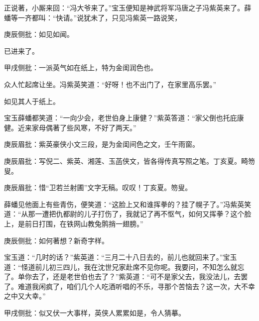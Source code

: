 \begin{parag}
    正说著，小厮来回：“冯大爷来了。”宝玉便知是神武将军冯唐之子冯紫英来了。薛蟠等一齐都叫：“快请。”说犹未了，只见冯紫英一路说笑，\begin{note}庚辰侧批：如见如闻。\end{note}已进来了。\begin{note}甲戌侧批：一派英气如在纸上，特为金闺润色也。\end{note}众人忙起席让坐。冯紫英笑道：“好呀！也不出门了，在家里高乐罢。”\begin{note}如见其人于纸上。\end{note}宝玉薛蟠都笑道：“一向少会，老世伯身上康健？”紫英答道：“家父倒也托庇康健。近来家母偶著了些风寒，不好了两天。”\begin{note}庚辰眉批：紫英豪侠小文三段，是为金闺间色之文，壬午雨窗。\end{note}\begin{note}庚辰眉批：写倪二、紫英、湘莲、玉菡侠文，皆各得传真写照之笔。丁亥夏。畸笏叟。\end{note}\begin{note}庚辰眉批：惜“卫若兰射圃”文字无稿。叹叹！丁亥夏。笏叟。\end{note}薛蟠见他面上有些青伤，便笑道：“这脸上又和谁挥拳的？挂了幌子了。”冯紫英笑道：“从那一遭把仇都尉的儿子打伤了，我就记了再不怄气，如何又挥拳？这个脸上，是前日打围，在铁网山教兔鹘捎一翅膀。”\begin{note}庚辰侧批：如何著想？新奇字样。\end{note}宝玉道：“几时的话？”紫英道：“三月二十八日去的，前儿也就回来了。”宝玉道：“怪道前儿初三四儿，我在沈世兄家赴席不见你呢。我要问，不知怎么就忘了。单你去了，还是老世伯也去了？”紫英道：“可不是家父去，我没法儿，去罢了。难道我闲疯了，咱们几个人吃酒听唱的不乐，寻那个苦恼去？这一次，大不幸之中又大幸。”\begin{note}甲戌侧批：似又伏一大事样，英侠人累累如是，令人猜摹。\end{note}
\end{parag}


